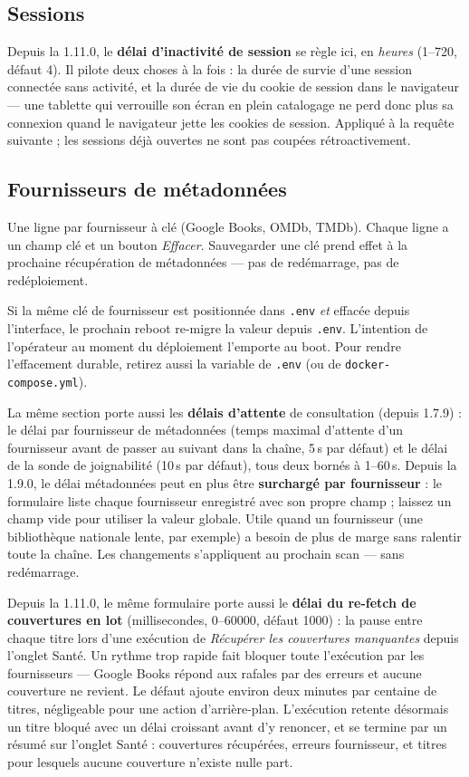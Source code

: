\subsection*{Sessions}

Depuis la 1.11.0, le \textbf{délai d'inactivité de session} se règle
ici, en \emph{heures} (1--720, défaut 4). Il pilote deux choses à la
fois : la durée de survie d'une session connectée sans activité, et
la durée de vie du cookie de session dans le navigateur — une
tablette qui verrouille son écran en plein catalogage ne perd donc
plus sa connexion quand le navigateur jette les cookies de session.
Appliqué à la requête suivante ; les sessions déjà ouvertes ne sont
pas coupées rétroactivement.

\subsection*{Fournisseurs de métadonnées}

Une ligne par fournisseur à clé (Google Books, OMDb, TMDb). Chaque
ligne a un champ clé et un bouton \emph{Effacer}. Sauvegarder une
clé prend effet à la prochaine récupération de métadonnées — pas de
redémarrage, pas de redéploiement.

\begin{note}
Si la même clé de fournisseur est positionnée dans \texttt{.env}
\emph{et} effacée depuis l'interface, le prochain reboot re-migre la
valeur depuis \texttt{.env}. L'intention de l'opérateur au moment du
déploiement l'emporte au boot. Pour rendre l'effacement durable,
retirez aussi la variable de \texttt{.env} (ou de
\texttt{docker-compose.yml}).
\end{note}

La même section porte aussi les \textbf{délais d'attente} de
consultation (depuis 1.7.9) : le délai par fournisseur de métadonnées
(temps maximal d'attente d'un fournisseur avant de passer au suivant
dans la chaîne, 5\,s par défaut) et le délai de la sonde de
joignabilité (10\,s par défaut), tous deux bornés à 1--60\,s. Depuis
la 1.9.0, le délai métadonnées peut en plus être \textbf{surchargé
par fournisseur} : le formulaire liste chaque fournisseur enregistré
avec son propre champ ; laissez un champ vide pour utiliser la valeur
globale. Utile quand un fournisseur (une bibliothèque nationale lente,
par exemple) a besoin de plus de marge sans ralentir toute la chaîne.
Les changements s'appliquent au prochain scan — sans redémarrage.

Depuis la 1.11.0, le même formulaire porte aussi le \textbf{délai du
re-fetch de couvertures en lot} (millisecondes, 0--60000, défaut
1000) : la pause entre chaque titre lors d'une exécution de
\emph{Récupérer les couvertures manquantes} depuis l'onglet Santé.
Un rythme trop rapide fait bloquer toute l'exécution par les
fournisseurs — Google Books répond aux rafales par des erreurs et
aucune couverture ne revient. Le défaut ajoute environ deux minutes
par centaine de titres, négligeable pour une action d'arrière-plan.
L'exécution retente désormais un titre bloqué avec un délai croissant
avant d'y renoncer, et se termine par un résumé sur l'onglet Santé :
couvertures récupérées, erreurs fournisseur, et titres pour lesquels
aucune couverture n'existe nulle part.

